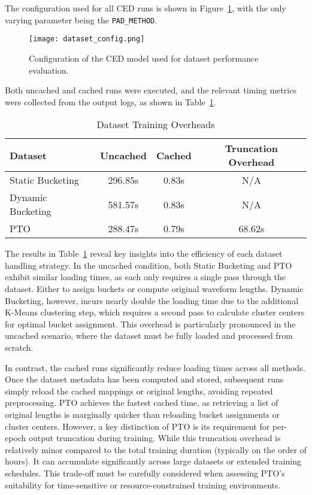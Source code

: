 The configuration used for all CED runs is shown in Figure~\ref{fig:dataset_config}, with the only varying parameter being the \texttt{PAD\_METHOD}.

\begin{figure}[H]
    \centering
    \texttt{[image: dataset\_config.png]}
    \caption{\label{fig:dataset_config} Configuration of the CED model used for dataset performance evaluation.}
\end{figure}

Both uncached and cached runs were executed, and the relevant timing metrics were collected from the output logs, as shown in Table~\ref{tab:dataset_loading_times}.

\vspace{1em}
\begin{table}[H]
\centering
\caption{Dataset Training Overheads}
\label{tab:dataset_loading_times}
\begin{tabular}{|l|c|c|c|}
\hline
\textbf{Dataset} & \textbf{Uncached} & \textbf{Cached} & \textbf{Truncation Overhead} \\
\hline
Static Bucketing  & 296.85s  & 0.83s   & N/A    \\
Dynamic Bucketing & 581.57s& 0.83s  & N/A    \\
PTO               & 288.47s & 0.79s  & 68.62s  \\
\hline
\end{tabular}
\end{table}

The results in Table~\ref{tab:dataset_loading_times} reveal key insights into the efficiency of each dataset handling strategy. In the uncached condition, both Static Bucketing and PTO exhibit similar loading times, as each only requires a single pass through the dataset. Either to assign buckets or compute original waveform lengths. Dynamic Bucketing, however, incurs nearly double the loading time due to the additional K-Means clustering step, which requires a second pass to calculate cluster centers for optimal bucket assignment. This overhead is particularly pronounced in the uncached scenario, where the dataset must be fully loaded and processed from scratch.

In contrast, the cached runs significantly reduce loading times across all methods. Once the dataset metadata has been computed and stored, subsequent runs simply reload the cached mappings or original lengths, avoiding repeated preprocessing. PTO achieves the fastest cached time, as retrieving a list of original lengths is marginally quicker than reloading bucket assignments or cluster centers. However, a key distinction of PTO is its requirement for per-epoch output truncation during training. While this truncation overhead is relatively minor compared to the total training duration (typically on the order of hours). It can accumulate significantly across large datasets or extended training schedules. This trade-off must be carefully considered when assessing PTO's suitability for time-sensitive or resource-constrained training environments.

